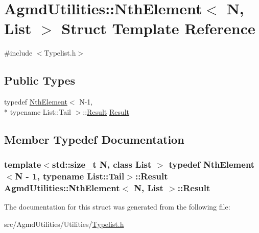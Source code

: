 \hypertarget{struct_agmd_utilities_1_1_nth_element}{\section{Agmd\+Utilities\+:\+:Nth\+Element$<$ N, List $>$ Struct Template Reference}
\label{struct_agmd_utilities_1_1_nth_element}
}


{\ttfamily \#include $<$Typelist.\+h$>$}

\subsection*{Public Types}
\begin{DoxyCompactItemize}
\item 
typedef \hyperlink{struct_agmd_utilities_1_1_nth_element}{Nth\+Element}$<$ N-\/1, \\*
typename List\+::\+Tail $>$\+::\hyperlink{struct_agmd_utilities_1_1_nth_element_a1adca2bec659e494c55782903e2f52c0}{Result} \hyperlink{struct_agmd_utilities_1_1_nth_element_a1adca2bec659e494c55782903e2f52c0}{Result}
\end{DoxyCompactItemize}


\subsection{Member Typedef Documentation}
\hypertarget{struct_agmd_utilities_1_1_nth_element_a1adca2bec659e494c55782903e2f52c0}{
\subsubsection[{Result}]{\setlength{\rightskip}{0pt plus 5cm}template$<$std\+::size\+\_\+t N, class List $>$ typedef {\bf Nth\+Element}$<$N -\/ 1, typename List\+::\+Tail$>$\+::{\bf Result} {\bf Agmd\+Utilities\+::\+Nth\+Element}$<$ N, {\bf List} $>$\+::{\bf Result}}}\label{struct_agmd_utilities_1_1_nth_element_a1adca2bec659e494c55782903e2f52c0}


The documentation for this struct was generated from the following file\+:\begin{DoxyCompactItemize}
\item 
src/\+Agmd\+Utilities/\+Utilities/\hyperlink{_typelist_8h}{Typelist.\+h}\end{DoxyCompactItemize}
